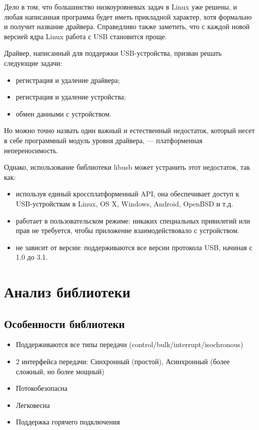 \documentclass[14pt,a4paper]{article}
\begin{document}
\par Дело в том, что большинство низкоуровневых задач в Linux уже решены, и любая написанная программа будет иметь прикладной характер, хотя формально и получит название драйвера. Справедливо также заметить, что с каждой новой версией ядра Linux работа с USB становится проще.

\par Драйвер, написанный для поддержки USB-устройства, призван решать следующие задачи:

\begin{itemize}
    \item регистрация и удаление драйвера;
    \item регистрация и удаление устройства;
    \item обмен данными с устройством.
\end{itemize}

Но можно точно назвать один важный и естественный недостаток, который несет в себе программный модуль уровня драйвера, — платформенная непереносимость.

\par Однако, использование библиотеки libusb может устранить этот недостаток, так как:
\begin{itemize}
    \item используя единый кроссплатформенный API, она обеспечивает доступ к USB-устройствам в Linux, OS X, Windows, Android, OpenBSD и т.д.
    \item работает в пользовательском режиме: никаких специальных привилегий или прав не требуется, чтобы приложение взаимодействовало с устройством.
    \item не зависит от версии: поддерживаются все версии протокола USB, начиная с 1.0 до 3.1.
\end{itemize}

\section{Анализ библиотеки}

\subsection{Особенности библиотеки}
\begin{itemize}
    \item Поддерживаются все типы передачи (control/bulk/interrupt/isochronous)
    \item 2 интерфейса передачи: Синхронный (простой), Асинхронный (более сложный, но более мощный)
    \item Потокобезопасна
    \item Легковесна
    \item Поддержка горячего подключения
\end{itemize}
\end{document}
